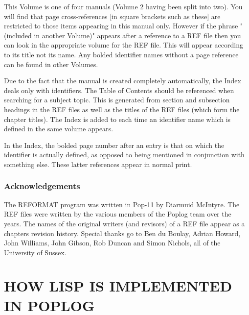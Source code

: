 This Volume is one of four manuals (Volume 2 having been split into
two). You will find that page cross-references [in square brackets such
as these] are restricted to those items appearing in this manual only.
However if the phrase "(included in another Volume)" appears after a
reference to a REF file then you can look in the appropriate volume for
the REF file. This will appear according to its title not its name.
Any bolded identifier names without a page reference can be found in
other Volumes.


Due to the fact that the manual is created completely automatically, the
Index deals only with identifiers. The Table of Contents should be
referenced when searching for a subject topic. This is generated from
section and subsection headings in the REF files as well as the titles
of the REF files (which form the chapter titles). The Index is added to each
time an identifier name which is defined in the same volume appears.

In the Index, the bolded page number after an entry is that on
which the identifier is actually defined, as opposed to being mentioned
in conjunction with something else. These latter references appear in
normal print.


\section*{Acknowledgements}

The REFORMAT program was written in Pop-11 by Diarmuid McIntyre. The REF
files were written by the various members of the Poplog team over the
years. The names of the original writers (and revisors) of a REF file
appear as a chapters revision history. Special thanks go to Ben du
Boulay, Adrian Howard, John Williams, John Gibson, Rob Duncan and Simon
Nichols, all of the University of Sussex.



\tableofcontents





\part{HOW LISP IS IMPLEMENTED IN POPLOG}

